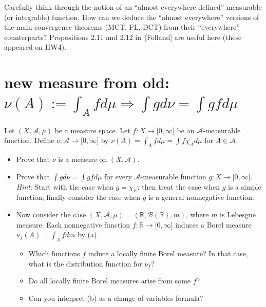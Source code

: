 \documentclass{qlnotes-export}
\begin{document}
Carefully think through the notion of an ``almost everywhere defined'' measurable (or integrable) function. How can we deduce the ``almost everywhere'' versions of the main convergence theorems (MCT, FL, DCT) from their ``everywhere'' counterparts? Propositions 2.11 and 2.12 in~{[}Folland{]} are useful here (these appeared on HW4).

\section{\texorpdfstring{new measure from old: \(\nu(A) := \int_{A}f d\mu\Longrightarrow\int g d\nu = \int gf d\mu\)}{new measure from old: \textbackslash nu(A) := \textbackslash int\_\{A\}f d\textbackslash mu\textbackslash Longrightarrow\textbackslash int g d\textbackslash nu = \textbackslash int gf d\textbackslash mu}}\label{new-measure-from-old-nuaint_a-f-dmu-impliesint-g-d-nu-int-gf-dmu}

Let \((X,\mathcal{A},\mu)\) be a measure space. Let \(f:X\rightarrow\lbrack 0,\infty\rbrack\) be an \(\mathcal{A}\)-measurable function. Define \(\nu:\mathcal{A}\rightarrow\lbrack 0,\infty\rbrack\) by \(\nu(A) = \int_{A}f d\mu = \int f\chi_{A} d\mu\) for \(A \in \mathcal{A}\).

\begin{itemize}
\item
  Prove that \(\nu\) is a measure on \((X,\mathcal{A})\).
\item
  Prove that \(\int g d\nu = \int gf d\mu\) for every \(\mathcal{A}\)-measurable function \(g:X\rightarrow\lbrack 0,\infty\rbrack\). \emph{Hint}: Start with the case when \(g = \chi_{E}\); then treat the case when \(g\) is a simple function; finally consider the case when \(g\) is a general nonnegative function.
\item
  Now consider the case \((X,\mathcal{A},\mu) = ({\mathbb{R}},\mathcal{B}({\mathbb{R}}),m)\), where \(m\) is Lebesgue measure. Each nonnegative function \(f:{\mathbb{R}}\rightarrow\lbrack 0,\infty\rbrack\) induces a Borel measure \(\nu_{f}(A) = \int_{A}f dm\) by (a).

  \begin{itemize}
  \item
    Which functions \(f\) induce a locally finite Borel measure? In that case, what is the distribution function for \(\nu_{f}\)?
  \item
    Do all locally finite Borel measures arise from some \(f\)?
  \item
    Can you interpret (b) as a change of variables formula?
  \end{itemize}
\end{itemize}
\end{document}
